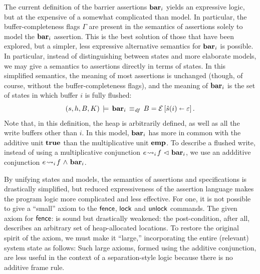 \documentclass[11pt]{report}
\begin{document}
The current definition of the barrier assertions $\mathbf{bar}_{i}$ yields an expressive logic, but at the expensive of a somewhat complicated than model. In particular, the buffer-completeness flags $\Gamma$ are present in the semantics of assertions solely to model the $\mathbf{bar}_{i}$ assertion. This is the best solution of those that have been explored, but a simpler, less expressive alternative semantics for $\mathbf{bar}_{i}$ is possible. In particular, instead of distinguishing between states and more elaborate models, we may give a semantics to assertions directly in terms of states. In this simplified semantics, the meaning of most assertions is unchanged (though, of course, without the buffer-completeness flags), and the meaning of $\mathbf{bar}_{i}$ is the set of states in which buffer $i$ is fully flushed: \[ (s,h,B,K) \,\models\, \mathbf{bar}_{i} \operatorname{\;\equiv_{\mathit{df}}\;} B = \mathcal{E} \left[ \hat{s}(i) \shortleftarrow \varepsilon \right].\] Note that, in this definition, the heap is arbitrarily defined, as well as all the write buffers other than $i$. In this model, $\mathbf{bar}_{i}$ has more in common with the additive unit $\mathbf{true}$ than the multiplicative unit $\mathbf{emp}$. To describe a flushed write, instead of using a multiplicative conjunction $e \!\leadsto_{i}\! f \operatorname{\,\vartriangleleft\,} \mathbf{bar}_{i}$, we use an addditive conjunction $e \!\leadsto_{i}\! f \operatorname{\,\wedge\,} \mathbf{bar}_{i}$. 

By unifying states and models, the semantics of assertions and specifications is drastically simplified, but reduced expressiveness of the assertion language makes the program logic more complicated and less effective. For one, it is not possible to give a ``small'' axiom to the $\operatorname{\mathsf{fence}}$, $\operatorname{\mathsf{lock}}$ and $\operatorname{\mathsf{unlock}}$ commands. The given axiom for $\operatorname{\mathsf{fence}}$:  is sound but drastically weakened: the post-condition, after all, describes an arbitrary set of heap-allocated locations. To restore the original spirit of the axiom, we must make it ``large,'' incorporating the entire (relevant) system state as follows:  Such large axioms, formed using the additive conjunction, are less useful in the context of a separation-style logic because there is no additive frame rule. 
\end{document}
